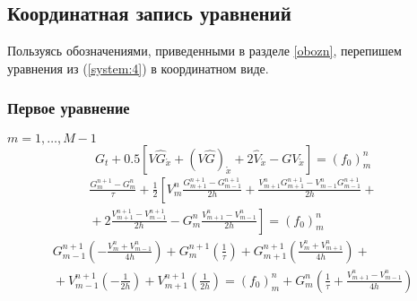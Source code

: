 \subsection{Координатная запись уравнений}
Пользуясь обозначениями, приведенными в разделе \ref{obozn}, перепишем уравнения из (\ref{system:4}) в координатном виде.

\subsubsection{Первое уравнение}
$m = 1,\dots, M - 1$
\begin{equation*}
  G_t + 0.5 [
    V \hat G_{\mathring{x}} + (V \hat G)_{\mathring{x}} +
    2 \hat V_{\mathring{x}} - G V_{\mathring{x}} ] = (f_0)_{m}^{n}
\end{equation*}
\begin{multline*}
  \frac{G_{m}^{n+1} - G_{m}^{n}}{\tau} + \frac12 \left[
    V_{m}^{n} \frac{G_{m+1}^{n+1} - G_{m-1}^{n+1}}{2h} +
    \frac{V_{m+1}^{n} G_{m+1}^{n+1} - V_{m-1}^{n} G_{m-1}^{n+1}}{2h} 
    \right. +{} \\ {}+ \left.
    2 \frac{V_{m+1}^{n+1} - V_{m-1}^{n+1}}{2h} -
    G_{m}^{n}\frac{V_{m+1}^{n} - V_{m-1}^{n}}{2h}
  \right] = (f_0)_{m}^{n}
\end{multline*}
\begin{multline*}
  G_{m-1}^{n+1} \left(-\frac{V_{m}^{n} + V_{m-1}^{n}}{4h} \right) +
  G_{m}^{n+1}   \left( \frac{1}{\tau} \right) +
  G_{m+1}^{n+1} \left( \frac{V_{m}^{n} + V_{m+1}^{n}}{4h} \right)
  +{} \\ {}+
  V_{m-1}^{n+1} \left(-\frac{1}{2h} \right) +
  V_{m+1}^{n+1} \left( \frac{1}{2h} \right)
   = (f_0)_{m}^{n} + 
  G_{m}^{n} \left( \frac{1}{\tau} + \frac{V_{m+1}^{n} - V_{m-1}^{n}}{4h} \right) 
\end{multline*}



